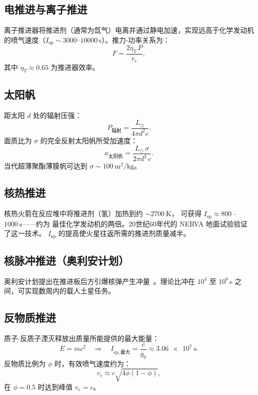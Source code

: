 \documentclass[12pt,a4paper]{article}
\begin{document}
\subsection{电推进与离子推进}

离子推进器将推进剂（通常为氙气）电离并通过静电加速，实现远高于化学发动机的喷气速度（$I_{\mathrm{sp}} \sim 3000$--$10000$\,s）。推力-功率关系为：
\begin{equation}
  F = \frac{2\eta_T\,P}{v_e},
\end{equation}
其中 $\eta_T \approx 0.65$ 为推进器效率。

\subsection{太阳帆}

距太阳 $d$ 处的辐射压强：
\begin{equation}
  P_{\mathrm{辐射}} = \frac{L_\odot}{4\pi d^2 c}.
\end{equation}
面质比为 $\sigma$ 的完全反射太阳帆所受加速度：
\begin{equation}
  a_{\mathrm{太阳帆}} = \frac{L_\odot\,\sigma}{2\pi d^2\,c}.
\end{equation}
当代超薄聚酯薄膜帆可达到
$\sigma \sim \SI{100}{\meter\squared\per\kilo\gram}$。

\subsection{核热推进}

核热火箭在反应堆中将推进剂（氢）加热到约 $\sim\SI{2700}{\kelvin}$，
可获得 $I_{\mathrm{sp}} \approx \SI{800}{}$--$\SI{1000}{\second}$——约为
最佳化学发动机的两倍。20世纪60年代的 NERVA 地面试验验证了这一技术。
$I_{\mathrm{sp}}$ 的提高使火星往返所需的推进剂质量减半。

\subsection{核脉冲推进（奥利安计划）}

奥利安计划提出在推进板后方引爆核弹产生冲量~\citep{Dyson1968}。理论比冲在 $10^4$ 至 $10^6$\,s 之间，可实现数周内的载人土星任务。

\subsection{反物质推进}

质子-反质子湮灭释放出质量所能提供的最大能量：
\begin{equation}
  E = mc^2 \quad \Rightarrow \quad
  I_{\mathrm{sp,最大}} = \frac{c}{g_0} \approx \SI{3.06e7}{\second}.
\end{equation}
反物质比例为 $\phi$ 时，有效喷气速度约为：
\begin{equation}
  v_e \approx c\sqrt{4\phi(1-\phi)},
\end{equation}
在 $\phi = 0.5$ 时达到峰值 $v_e = c$。
\end{document}
